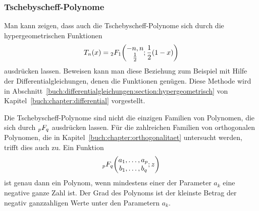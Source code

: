 \subsubsection{Tschebyscheff-Polynome}
%
Man kann zeigen, dass auch die Tschebyscheff-Polynome sich durch die
hypergeometrischen Funktionen
\begin{equation}
T_n(x)
=
\mathstrut_2F_1\biggl(
\begin{matrix}-n,n\\\frac12\end{matrix}
;
\frac12(1-x)
\biggr)
\label{buch:rekursion:hypergeometrisch:tschebyscheff2f1}
\end{equation}
ausdrücken lassen.
Beweisen kann man diese Beziehung zum Beispiel mit Hilfe der
Differentialgleichungen, denen die Funktionen genügen.
Diese Methode wird in
Abschnitt~\ref{buch:differentialgleichungen:section:hypergeometrisch}
von Kapitel~\ref{buch:chapter:differential} vorgestellt.

Die Tschebyscheff-Polynome sind nicht die einzigen Familien von Polynomen,
die sich durch $\mathstrut_pF_q$ ausdrücken lassen.
Für die zahlreichen Familien von orthogonalen Polynomen, die in
Kapitel~\ref{buch:chapter:orthogonalitaet} untersucht werden,
trifft dies auch zu.
Ein Funktion
\[
\mathstrut_pF_q
\biggl(
\begin{matrix}
a_1,\dots,a_p\\
b_1,\dots,b_q
\end{matrix}
;z
\biggr)
\]
ist genau dann ein Polynom, wenn mindestens einer der Parameter
$a_k$ eine negative ganze Zahl ist.
Der Grad des Polynoms ist der kleinste Betrag der negativ ganzzahligen
Werte unter den Parametern $a_k$.

%
%

